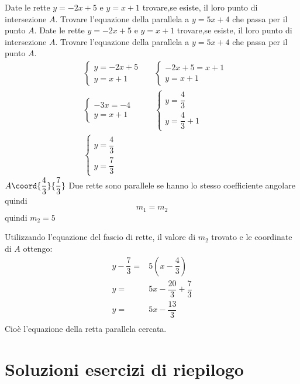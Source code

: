 \begin{exercise}
	Date le rette $y=-2x+5$ e $y=x+1$ trovare,se esiste, il loro punto di intersezione $A$. Trovare l'equazione della parallela a $y=5x+4$ che passa per il punto $A$.
	\tcblower
	Date le rette $y=-2x+5$ e $y=x+1$ trovare,se esiste, il loro punto di intersezione $A$. Trovare l'equazione della parallela a $y=5x+4$ che passa per il punto $A$.
	\begin{align*}
	&\begin{cases}
	y=-2x+5\\
	y=x+1
	\end{cases}
	&&\begin{cases}
	-2x+5=x+1\\
	y=x+1
	\end{cases}\\
	&\begin{cases}
	-3x=-4\\
	y=x+1
	\end{cases}
	&&\begin{cases}
	y=\dfrac{4}{3}\\[.5em]
	y=\dfrac{4}{3}+1
	\end{cases}\\
	&\begin{cases}
y=\dfrac{4}{3}\\[.5em]
y=\dfrac{7}{3}
	\end{cases}
	\end{align*}
	$A\coord{\dfrac{4}{3}}{\dfrac{7}{3}}$
	Due rette sono parallele se hanno lo stesso coefficiente angolare quindi \[m_1=m_2 \]
	quindi $m_2=5$
	
	Utilizzando l'equazione del fascio di rette, il valore di $m_2$ trovato e le coordinate di $A$ ottengo:
	\begin{align*}
	y-\dfrac{7}{3}=&5(x-\dfrac{4}{3})\\
	y=&5x-\dfrac{20}{3}+\dfrac{7}{3}\\
	y=&5x-\dfrac{13}{3}\\
	\end{align*}
	Cioè l'equazione della retta parallela cercata.
	\begin{center}
		
	\end{center}
	
\end{exercise}
\tcbstoprecording
\newpage
\section{Soluzioni esercizi di riepilogo}
\tcbinputrecords							